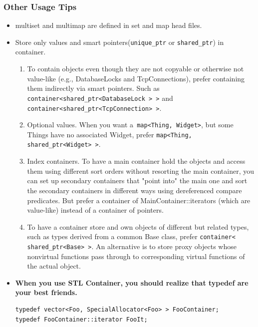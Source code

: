 \documentclass[a4paper,11pt,twoside]{book}
\begin{document}
\subsubsection{Other Usage Tips}
\begin{itemize}
	
	
\item multiset and multimap are defined in set and map head files.

\item Store only values and smart pointers(\texttt{unique\_ptr} or \texttt{shared\_ptr}) in container.

\begin{enumerate}
	\item To contain objects even though they are not copyable or otherwise not value-like (e.g., DatabaseLocks and
	TcpConnections), prefer containing them indirectly via smart pointers. Such as
	\texttt{container<shared\_ptr<DatabaseLock > >} and \\
	\texttt{container<shared\_ptr<TcpConnection> >}.
	
	\item Optional values. When you want a\texttt{ map<Thing, Widget>}, but some Things have no associated Widget, prefer \texttt{map<Thing, shared\_ptr<Widget> >}.
	
	\item Index containers. To have a main container hold the objects and access them using different sort orders without resorting the main container, you can set up secondary containers that "point into" the main one and sort the secondary containers in different ways using dereferenced compare predicates. But prefer a container of MainContainer::iterators (which are value-like) instead of a container of pointers.
	
	\item To have a container store and own objects of different but related types, such as types derived from a common Base class, prefer \texttt{container< shared\_ptr<Base> >}. An alternative is to store proxy objects whose nonvirtual functions pass through to corresponding virtual functions of the actual object.
\end{enumerate}



\item \textbf{When you use STL Container, you should realize that typedef are your best friends.}
\begin{lstlisting}[numbers=none]
typedef vector<Foo, SpecialAllocator<Foo> > FooContainer;
typedef FooContainer::iterator FooIt;


\end{lstlisting}
\end{itemize}
\end{document}
